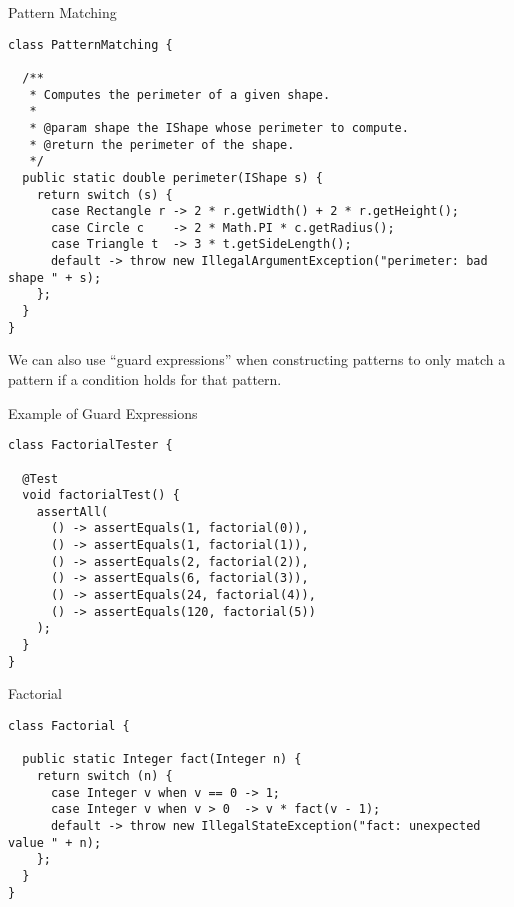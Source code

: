 \begin{cl}{Pattern Matching}
\begin{lstlisting}[language=MyJava]
class PatternMatching {

  /**
   * Computes the perimeter of a given shape.
   * 
   * @param shape the IShape whose perimeter to compute.
   * @return the perimeter of the shape.
   */
  public static double perimeter(IShape s) {
    return switch (s) {
      case Rectangle r -> 2 * r.getWidth() + 2 * r.getHeight();
      case Circle c    -> 2 * Math.PI * c.getRadius();
      case Triangle t  -> 3 * t.getSideLength();
      default -> throw new IllegalArgumentException("perimeter: bad shape " + s);
    };
  }
}
\end{lstlisting}
\end{cl}

We can also use ``guard expressions'' when constructing patterns to only match a pattern if a condition holds for that pattern.


\begin{cl}{Example of Guard Expressions} 
\begin{lstlisting}[language=MyJava]
class FactorialTester {

  @Test
  void factorialTest() {
    assertAll(
      () -> assertEquals(1, factorial(0)),
      () -> assertEquals(1, factorial(1)),
      () -> assertEquals(2, factorial(2)),
      () -> assertEquals(6, factorial(3)),
      () -> assertEquals(24, factorial(4)),
      () -> assertEquals(120, factorial(5))
    );
  }
}
\end{lstlisting}
\end{cl}

\begin{cl}{Factorial}
\begin{lstlisting}[language=MyJava]
class Factorial {

  public static Integer fact(Integer n) {
    return switch (n) {
      case Integer v when v == 0 -> 1;
      case Integer v when v > 0  -> v * fact(v - 1);
      default -> throw new IllegalStateException("fact: unexpected value " + n);
    };
  }
}
\end{lstlisting}
\end{cl}

